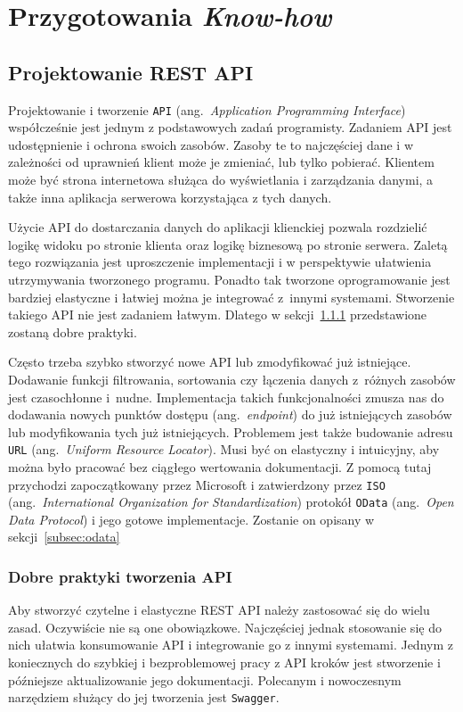 \chapter{Przygotowania \emph{Know-how}}
\label{chap:know-how}
\section{Projektowanie REST API}
\label{sec:projektowanie-api}
Projektowanie i tworzenie \texttt{API} (ang.~\emph{Application Programming Interface}) współcześnie jest jednym z podstawowych zadań programisty. Zadaniem API jest udostępnienie i ochrona swoich zasobów. Zasoby te to najczęściej dane i w zależności od uprawnień klient może je zmieniać, lub tylko pobierać. Klientem może być strona internetowa służąca do wyświetlania i zarządzania danymi, a także inna aplikacja serwerowa korzystająca z tych danych.

Użycie API do dostarczania danych do aplikacji klienckiej pozwala rozdzielić logikę widoku po stronie klienta oraz logikę biznesową po stronie serwera. Zaletą tego rozwiązania jest uproszczenie implementacji i w perspektywie ułatwienia utrzymywania tworzonego programu. Ponadto tak tworzone oprogramowanie jest bardziej elastyczne i łatwiej można je integrować z~innymi systemami. Stworzenie takiego API nie jest zadaniem łatwym. Dlatego w sekcji~\ref{subsec:api-dobre-praktyki} przedstawione zostaną dobre praktyki.

Często trzeba szybko stworzyć nowe API lub zmodyfikować już istniejące. Dodawanie funkcji filtrowania, sortowania czy łączenia danych z~różnych zasobów jest czasochłonne i~nudne. Implementacja takich funkcjonalności zmusza nas do dodawania nowych punktów dostępu (ang.~\emph{endpoint}) do już istniejących zasobów lub modyfikowania tych już istniejących. Problemem jest także budowanie adresu \texttt{URL} (ang.~\emph{Uniform Resource Locator}). Musi być on elastyczny i intuicyjny, aby można było pracować bez ciągłego wertowania dokumentacji. Z pomocą tutaj przychodzi zapoczątkowany przez Microsoft i zatwierdzony przez \texttt{ISO} (ang.~\emph{International Organization for Standardization}) protokół \texttt{OData} (ang.~\emph{Open Data Protocol}) i jego gotowe implementacje. Zostanie on opisany w sekcji~\ref{subsec:odata}

\subsection{Dobre praktyki tworzenia API} 
\label{subsec:api-dobre-praktyki}
Aby stworzyć czytelne i elastyczne REST API należy zastosować się do wielu zasad. Oczywiście nie są one obowiązkowe. Najczęściej jednak stosowanie się do nich ułatwia konsumowanie API i integrowanie go z innymi systemami. Jednym z koniecznych do szybkiej i bezproblemowej pracy z API kroków jest stworzenie i późniejsze aktualizowanie jego dokumentacji. Polecanym i nowoczesnym narzędziem służący do jej tworzenia jest \texttt{Swagger}. 

